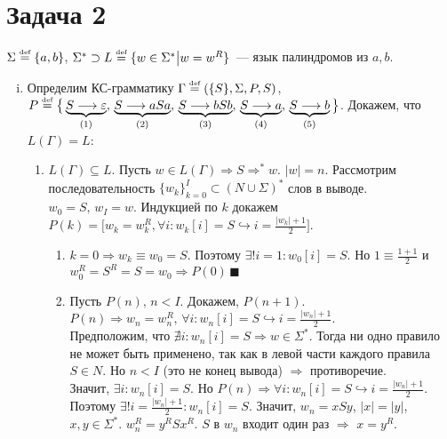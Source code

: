 \documentclass[a4paper]{article}
\def\eqdef{\overset{\mbox{\tiny def}}{=}}
\begin{document}
\section*{Задача 2}
$\Sigma\eqdef\{a,b\}$, $\Sigma^*\supset L\eqdef\{w\in\Sigma^*\big|w=w^R\}$~--- язык палиндромов из $a,b$.
\begin{enumerate}[i.]
\def\ansba{$\Gamma\eqdef(\{S\},\Sigma,P,S)$, $P\eqdef\big\{\underbrace{S\longrightarrow\varepsilon}_{(1)},\,\underbrace{S\longrightarrow aSa}_{(2)},\,\underbrace{S\longrightarrow bSb}_{(3)},\,\underbrace{S\longrightarrow a}_{(4)},\,\underbrace{S\longrightarrow b}_{(5)}\big\}$}
\def\ansbac{\Gamma\eqdef(\{S\},\Sigma,P,S)$, $P\eqdef\big\{S\longrightarrow\varepsilon\big|aSa\big|bSb\big|a\big|b\big\}}
\item Определим КС-грамматику \ansba.\newline
Докажем, что $L(\Gamma)=L$:
\begin{enumerate}
\item $L(\Gamma)\subseteq L$. Пусть $w\in L(\Gamma)\Rightarrow S\Longrightarrow^* w$. $|w|=n$. Рассмотрим последовательность $\{w_k\}^I_{k=0}\subset (N\cup\Sigma)^*$ слов в выводе. $w_0=S,\,w_I=w$. Индукцией по $k$ докажем $P(k)=\big[w_k=w_k^R,\forall i\colon w_k[i]=S\hookrightarrow i=\frac{|w_k|+1}{2}\big]$.\begin{enumerate}[1.]
\item $k=0\Rightarrow w_k\equiv w_0=S$. Поэтому $\exists ! i=1\colon w_0[i]=S$. Но $1\equiv\frac{1+1}{2}$ и $w_0^R=S^R=S=w_0\Rightarrow P(0)\,\blacksquare$
\item Пусть $P(n),\,n<I$. Докажем, $P(n+1)$. $P(n)\Rightarrow w_n=w_n^R,\,\forall i\colon w_n[i]=S\hookrightarrow i=\frac{|w_n|+1}{2}$.
\\[1pt]
Предположим, что $\nexists i\colon w_n[i]=S\Rightarrow w\in \Sigma^*$. Тогда ни одно правило не может быть применено, так как в левой части каждого правила $S\in N$. Но $n<I$ (это не конец вывода) $\Rightarrow$ противоречие.
\\[1pt]
Значит, $\exists i\colon w_n[i]=S$. Но $P(n)\Rightarrow \forall i\colon w_n[i]=S\hookrightarrow i=\frac{|w_n|+1}{2}$. Поэтому $\exists!i=\frac{|w_n|+1}{2}\colon w_n[i]=S$. Значит, $w_n=xSy$, $|x|=|y|$, $x,y\in\Sigma^*$. $w_n^R=y^RSx^R$. $S$ в $w_n$ входит один раз $\Rightarrow$ $x=y^R$.\newline

\end{enumerate}
\end{enumerate}
\end{enumerate}
\end{document}
